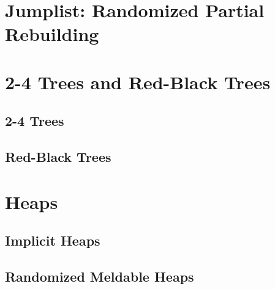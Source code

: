 \documentclass{book}
\begin{document}
\chapter{Jumplist: Randomized Partial Rebuilding}

\chapter{2-4 Trees and Red-Black Trees}
\section{2-4 Trees}
\section{Red-Black Trees}

\chapter{Heaps}
\section{Implicit Heaps}
\section{Randomized Meldable Heaps}
\end{document}
